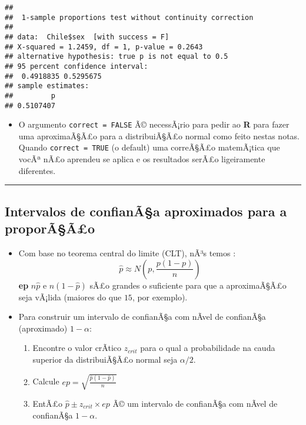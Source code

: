 \documentclass[]{article}
\providecommand{\tightlist}{%
  \setlength{\itemsep}{0pt}\setlength{\parskip}{0pt}}
\begin{document}
\begin{verbatim}
## 
##  1-sample proportions test without continuity correction
## 
## data:  Chile$sex  [with success = F]
## X-squared = 1.2459, df = 1, p-value = 0.2643
## alternative hypothesis: true p is not equal to 0.5
## 95 percent confidence interval:
##  0.4918835 0.5295675
## sample estimates:
##         p 
## 0.5107407
\end{verbatim}

\begin{itemize}
\tightlist
\item
  O argumento \texttt{correct\ =\ FALSE} Ã© necessÃ¡rio para pedir ao
  \textbf{R} para fazer uma aproximaÃ§Ã£o para a distribuiÃ§Ã£o normal
  como feito nestas notas. Quando \texttt{correct\ =\ TRUE} (o default)
  uma correÃ§Ã£o matemÃ¡tica que vocÃª nÃ£o aprendeu se aplica e os
  resultados serÃ£o ligeiramente diferentes.
\end{itemize}

\begin{center}\rule{0.5\linewidth}{\linethickness}\end{center}

\subsection{Intervalos de confianÃ§a aproximados para a
proporÃ§Ã£o}\label{intervalos-de-confianaa-aproximados-para-a-proporaao}

\begin{itemize}
\tightlist
\item
  Com base no teorema central do limite (CLT), nÃ³s temos :
  \[\hat{p}\approx N \left (p,{\frac{p(1-p)}{n}} \right)\] \textbf{ep}
  \(n\hat{p}\) e \(n(1-\hat{p})\) sÃ£o grandes o suficiente para que a
  aproximaÃ§Ã£o seja vÃ¡lida (maiores do que \(15\), por exemplo).
\item
  Para construir um intervalo de confianÃ§a com nÃ­vel de confianÃ§a
  (aproximado) \(1-\alpha\):

  \begin{enumerate}
  \def\labelenumi{\arabic{enumi})}
  \tightlist
  \item
    Encontre o valor crÃ­tico \(z_{crit}\) para o qual a probabilidade
    na cauda superior da distribuiÃ§Ã£o normal seja \(\alpha/2\). 
  \item
    Calcule \(ep=\sqrt{\frac{\hat{p}(1-\hat{p})}{n}}\)
  \item
    EntÃ£o \(\hat{p}\pm z_{crit}\times ep\) Ã© um intervalo de
    confianÃ§a com nÃ­vel de confianÃ§a \(1-\alpha\).
  \end{enumerate}
\end{itemize}
\end{document}
